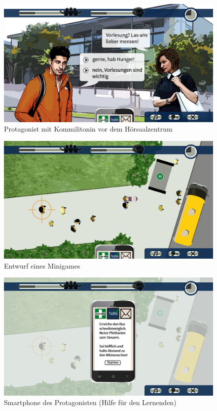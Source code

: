\documentclass[a4paper,10pt]{article}
\begin{document}
\begin{figure}
	\centering
	\includegraphics[width=\textwidth]{../layout/layout_hsz.png}
	\caption{Protagonist mit Kommilitonin vor dem Hörsaalzentrum}
\end{figure}

\begin{figure}
	\centering
	\includegraphics[width=\textwidth]{../layout/layout_busspiel.png}
	\caption{Entwurf eines Minigames}
\end{figure}

\begin{figure}
	\centering
	\includegraphics[width=\textwidth]{../layout/layout_busspiel_menu.png}
	\caption{Smartphone des Protagonisten (Hilfe für den Lernenden)}
\end{figure}
\end{document}
